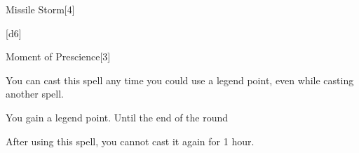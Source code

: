 \begin{spellsection}{Missile Storm}[4]
    \begin{spellheader}
    \end{spellheader}
    \begin{spellcontent}
        \begin{spelltargetinginfo}
        \end{spelltargetinginfo}
        \begin{spelleffects}
            \spelleffect {}[d6]
        \end{spelleffects}
    \end{spellcontent}
    \begin{spellfooter}
        \miscastexplode
    \end{spellfooter}
    \begin{spellaugments}
    \end{spellaugments}
\end{spellsection}

\begin{spellsection}{Moment of Prescience}[3]
    \begin{spellheader}
    \end{spellheader}
    \begin{spellcontent}
        \begin{spelltargetinginfo}
            \spellspecial You can cast this spell any time you could use a legend point, even while casting another spell.
        \end{spelltargetinginfo}
        \begin{spelleffects}
            \spelleffect You gain a legend point.
            \spelldur Until the end of the round
        \end{spelleffects}
    \end{spellcontent}
    \begin{spellfooter}
        \spellnotes After using this spell, you cannot cast it again for 1 hour.
        \miscastexplode
    \end{spellfooter}
\end{spellsection}

